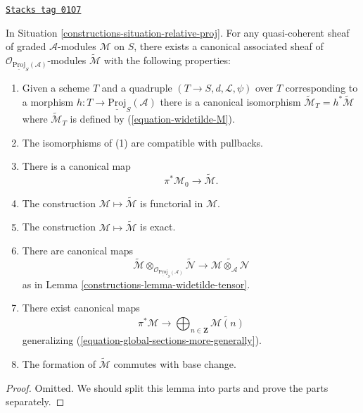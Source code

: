 \begin{lemma}
\label{constructions-lemma-relative-proj-modules}
\href{https://stacks.math.columbia.edu/tag/01O7}{\texttt{Stacks tag 01O7}}

In Situation \ref{constructions-situation-relative-proj}.
For any quasi-coherent sheaf of graded $\mathcal{A}$-modules
$\mathcal{M}$ on $S$, there exists a canonical associated sheaf
of $\mathcal{O}_{\underline{\text{Proj}}_S(\mathcal{A})}$-modules
$\widetilde{\mathcal{M}}$ with the following properties:
\begin{enumerate}
\item Given a scheme $T$ and a quadruple
$(T \to S, d, \mathcal{L}, \psi)$ over $T$
corresponding to a morphism
$h : T \to \underline{\text{Proj}}_S(\mathcal{A})$ there is
a canonical isomorphism
$\widetilde{\mathcal{M}}_T = h^*\widetilde{\mathcal{M}}$
where $\widetilde{\mathcal{M}}_T$ is defined by (\ref{equation-widetilde-M}).
\item The isomorphisms of (1) are compatible with pullbacks.
\item There is a canonical map
$$
\pi^*\mathcal{M}_0 \longrightarrow \widetilde{\mathcal{M}}.
$$
\item The construction $\mathcal{M} \mapsto \widetilde{\mathcal{M}}$
is functorial in $\mathcal{M}$.
\item The construction $\mathcal{M} \mapsto \widetilde{\mathcal{M}}$
is exact.
\item There are canonical maps
$$
\widetilde{\mathcal{M}}
\otimes_{\mathcal{O}_{\underline{\text{Proj}}_S(\mathcal{A})}}
\widetilde{\mathcal{N}}
\longrightarrow
\widetilde{\mathcal{M} \otimes_\mathcal{A} \mathcal{N}}
$$
as in
Lemma \ref{constructions-lemma-widetilde-tensor}.
\item There exist canonical maps
$$
\pi^*\mathcal{M}
\longrightarrow
\bigoplus\nolimits_{n \in \mathbf{Z}}
\widetilde{\mathcal{M}(n)}
$$
generalizing (\ref{equation-global-sections-more-generally}).
\item The formation of $\widetilde{\mathcal{M}}$ commutes with base change.
\end{enumerate}
\end{lemma}

\begin{proof}
Omitted. We should split this lemma into parts and prove the parts separately.
\end{proof}

